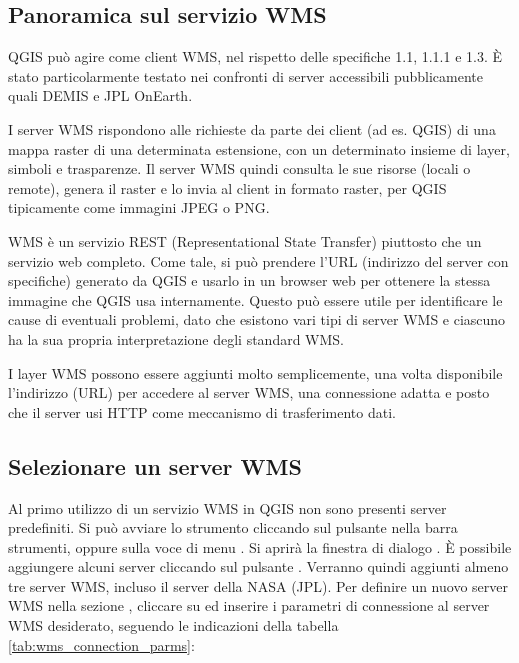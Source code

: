 \subsection{Panoramica sul servizio WMS}\label{sec:ogc-wms-about}

QGIS può agire come client WMS, nel rispetto delle specifiche 1.1, 1.1.1 e 1.3.
È stato particolarmente testato nei confronti di server accessibili pubblicamente
quali DEMIS e JPL OnEarth.

I server WMS rispondono alle richieste da parte dei client (ad es. QGIS) di una mappa raster
di una determinata estensione, con un determinato insieme di layer, simboli e trasparenze.
Il server WMS quindi consulta le sue risorse (locali o remote), genera il raster e lo invia
al client in formato raster, per QGIS tipicamente come immagini JPEG o PNG.

WMS è un servizio REST (Representational State Transfer) piuttosto che un servizio web completo.
Come tale, si può prendere l'URL (indirizzo del server con specifiche) generato da QGIS e usarlo
in un browser web per ottenere la stessa immagine che QGIS usa internamente. Questo può essere
utile per identificare le cause di eventuali problemi, dato che esistono vari tipi di server
WMS e ciascuno ha la sua propria interpretazione degli standard WMS.

I layer WMS possono essere aggiunti molto semplicemente, una volta
disponibile l'indirizzo (URL) per accedere al server WMS, una connessione adatta
e posto che il server usi HTTP come meccanismo di trasferimento dati.

\subsection{Selezionare un server WMS}\label{sec:ogc-wms-servers}

Al primo utilizzo di un servizio WMS in QGIS non sono presenti
server predefiniti. Si può avviare lo strumento cliccando sul pulsante
 nella barra strumenti, 
oppure sulla voce di menu
 \arrow {}.
Si aprirà la finestra di dialogo . È
possibile aggiungere alcuni server cliccando sul pulsante
. Verranno quindi aggiunti almeno tre
server WMS, incluso il server della NASA (JPL). Per definire un nuovo server WMS
nella sezione , cliccare su  ed inserire
i parametri di connessione al server WMS desiderato, seguendo le indicazioni della
tabella \ref{tab:wms_connection_parms}:

